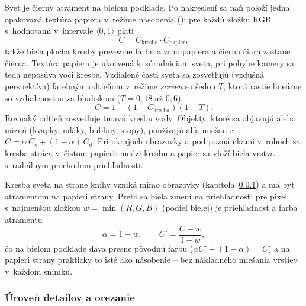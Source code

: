 \documentclass[11pt, a4paper]{article}
\begin{document}
Svet je čierny atrament na bielom podklade. Po nakreslení sa naň položí jedna opakovaná textúra
papiera v~režime násobenia (); pre každú zložku RGB s~hodnotami
v~intervale $\langle 0, 1\rangle$ platí
\begin{equation}
  C = C_{\text{kresba}} \cdot C_{\text{papier}},
\end{equation}
takže biela plocha kresby prevezme farbu a zrno papiera a čierna čiara zostane čierna.
Textúra papiera je ukotvená k~súradniciam sveta, pri pohybe kamery sa teda neposúva voči kresbe.
Vzdialené časti sveta sa zosvetľujú (vzdušná perspektíva) farebným odtieňom v~režime
\emph{screen} so šedou $T$, ktorá rastie lineárne so vzdialenosťou za bludiskom
($T = 0{,}18$ až $0{,}6$):
\begin{equation}
  C = 1 - (1 - C_{\text{kresba}})(1 - T).
\end{equation}
Rovnaký odtieň zosvetľuje tmavú kresbu vody. Objekty, ktoré sa objavujú alebo miznú (kvapky,
mláky, bubliny, stopy), používajú alfa miešanie~\cite[kap.~1]{Sobota2024}
$C = \alpha\, C_s + (1 - \alpha)\, C_d$. Pri okrajoch obrazovky a pod poznámkami v~rohoch sa
kresba stráca v~čistom papieri: medzi kresbu a papier sa vloží biela vrstva s~radiálnym
prechodom priehľadnosti.

Kresba sveta na strane knihy vzniká mimo obrazovky (kapitola~\ref{sec:lod}) a má byť
atramentom na papieri strany. Preto sa biela zmení na priehľadnosť: pre pixel s~najmenšou
zložkou $w = \min(R, G, B)$ (podiel bielej) je priehľadnosť a farba atramentu
\begin{equation}
  \alpha = 1 - w, \qquad C' = \frac{C - w}{1 - w},
\end{equation}
čo na bielom podklade dáva presne pôvodnú farbu ($\alpha C' + (1 - \alpha) = C$) a na papieri
strany prakticky to isté ako násobenie – bez nákladného miešania vrstiev v~každom snímku.

\subsubsection{Úroveň detailov a orezanie}\label{sec:lod}
\end{document}
